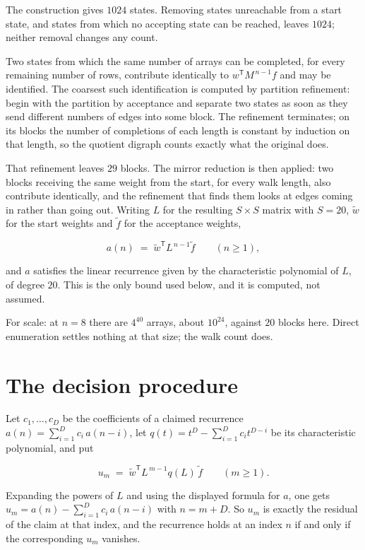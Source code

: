 \documentclass[11pt]{article}
\theoremstyle{definition}
\begin{document}
The construction gives $1024$ states. Removing states unreachable from a start state, and states from which no accepting state can be reached, leaves $1024$; neither removal changes any count.

Two states from which the same number of arrays can be completed, for every remaining number of rows, contribute identically to $w^{\mathsf T}M^{\,n-1}f$ and may be identified. The coarsest such identification is computed by partition refinement: begin with the partition by acceptance and separate two states as soon as they send different numbers of edges into some block. The refinement terminates; on its blocks the number of completions of each length is constant by induction on that length, so the quotient digraph counts exactly what the original does.

That refinement leaves $29$ blocks. The mirror reduction is then applied: two blocks receiving the same weight from the start, for every walk length, also contribute identically, and the refinement that finds them looks at edges coming in rather than going out. Writing $L$ for the resulting $S \times S$ matrix with $S = 20$, $\tilde w$ for the start weights and $\tilde f$ for the acceptance weights,

\[a(n) \;=\; \tilde w^{\mathsf T} L^{\,n-1} \tilde f \qquad (n \ge 1),\]

and $a$ satisfies the linear recurrence given by the characteristic polynomial of $L$, of degree $20$. This is the only bound used below, and it is computed, not assumed.

For scale: at $n = 8$ there are $4^{40}$ arrays, about $10^{24}$, against $20$ blocks here. Direct enumeration settles nothing at that size; the walk count does.

\section{The decision procedure}

Let $c_1,\dots,c_D$ be the coefficients of a claimed recurrence $a(n) = \sum_{i=1}^{D} c_i\,a(n-i)$, let $q(t) = t^{D} - \sum_{i=1}^{D} c_i t^{D-i}$ be its characteristic polynomial, and put

\[u_m \;=\; \tilde w^{\mathsf T} L^{\,m-1} q(L)\,\tilde f \qquad (m \ge 1).\]

Expanding the powers of $L$ and using the displayed formula for $a$, one gets $u_m = a(n) - \sum_{i=1}^{D} c_i\,a(n-i)$ with $n = m + D$. So $u_m$ is exactly the residual of the claim at that index, and the recurrence holds at an index $n$ if and only if the corresponding $u_m$ vanishes.
\end{document}

